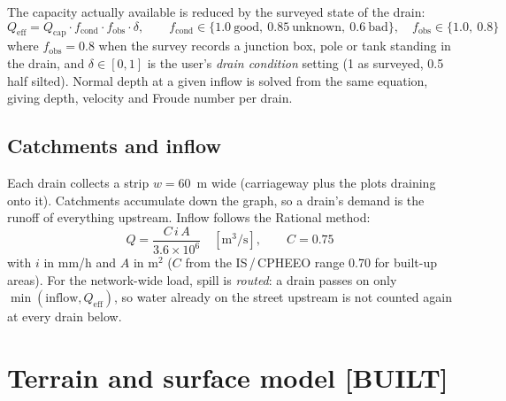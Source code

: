 \documentclass[11pt,a4paper]{article}
\newcommand{\built}{\textcolor{built}{\small\textbf{[BUILT]}}}
\begin{document}
The capacity actually available is reduced by the surveyed state of the drain:
\begin{equation}
  Q_{\text{eff}} = Q_{\text{cap}} \cdot f_{\text{cond}} \cdot f_{\text{obs}} \cdot \delta,
  \qquad f_{\text{cond}} \in \{1.0\ \text{good},\ 0.85\ \text{unknown},\ 0.6\ \text{bad}\},\quad
  f_{\text{obs}} \in \{1.0,\ 0.8\}
\end{equation}
where $f_{\text{obs}}=0.8$ when the survey records a junction box, pole or tank standing
in the drain, and $\delta\in[0,1]$ is the user's \emph{drain condition} setting (1 as
surveyed, 0.5 half silted). Normal depth at a given inflow is solved from the same
equation, giving depth, velocity and Froude number per drain.

\subsection{Catchments and inflow}
Each drain collects a strip $w = 60$~m wide (carriageway plus the plots draining onto
it). Catchments accumulate down the graph, so a drain's demand is the runoff of
everything upstream. Inflow follows the Rational method:
\begin{equation}
  Q = \frac{C\, i\, A}{3.6\times 10^{6}}\quad [\text{m}^3/\text{s}],\qquad C = 0.75
\end{equation}
with $i$ in mm/h and $A$ in m$^2$ ($C$ from the IS\,/\,CPHEEO range 0.70
for built-up areas). For the network-wide load, spill is \emph{routed}: a drain passes
on only $\min(\text{inflow}, Q_{\text{eff}})$, so water already on the street upstream is
not counted again at every drain below.

\section{Terrain and surface model \built}
\end{document}
